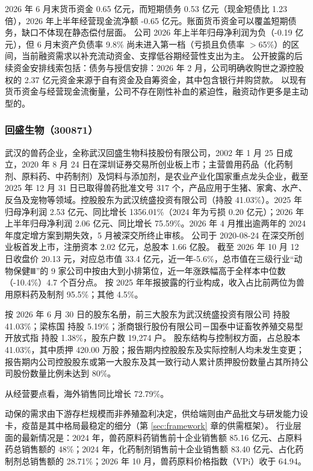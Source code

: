  2026 年 6 月末货币资金 0.65 亿元，而短期债务 0.53 亿元（现金短债比 1.23 倍），2026 年上半年经营现金流净额 -0.65 亿元。账面货币资金可以覆盖短期债务，缺口不体现在静态偿付层面。 公司 2026 年上半年归母净利润为负（-0.19 亿元），但 6 月末资产负债率 9.8\% 尚未进入第一档（亏损且负债率 $>$65\%）的区间，当前融资需求以补充流动资金、支撑低谷期经营性支出为主。 公开披露的后续资金安排线索包括：债务与授信安排：2026 年 2 月，公司明确收购世之源控股权的 2.37 亿元资金来源于自有资金及自筹资金，其中包含银行并购贷款。 以现有货币资金与经营现金流衡量，公司不存在刚性补血的紧迫性，融资动作更多是主动型的。




\subsubsection{回盛生物（300871）}
\label{co:300871}

 武汉的兽药企业，全称武汉回盛生物科技股份有限公司，2002 年 1 月 25 日成立，2020 年 8 月 24 日在深圳证券交易所创业板上市；主营兽用药品（化药制剂、原料药、中药制剂）及饲料与添加剂，是农业产业化国家重点龙头企业，截至 2025 年 12 月 31 日已取得兽药批准文号 317 个，产品应用于生猪、家禽、水产、反刍及宠物等领域。控股股东为武汉统盛投资有限公司（持股 41.03\%）。2025 年归母净利润 2.53 亿元、同比增长 1356.01\%（2024 年为亏损 0.20 亿元）；2026 年上半年归母净利润 2.06 亿元、同比增长 75.59\%。2026 年 4 月推出逾两年的 2024 年度定增方案到期失效，5 月被深交所终止审核。 公司于 2020-08-24 在深交所创业板首发上市，注册资本 2.02 亿元，总股本 1.66 亿股。 截至 2026 年 10 月 12 日收盘价 20.13 元，对应总市值 33.4 亿元，近一年-5.6\%，总市值在三级行业“动物保健Ⅲ”的 9 家公司中按由大到小排第位，近一年涨跌幅高于全样本中位数（-10.4\%）4.7 个百分点。 按 2025 年年报披露的行业构成，收入占比前两位为兽用原料药及制剂 95.5\%；其他 4.5\%。

 按 2026 年 6 月 30 日的股东名册，前三大股东为武汉统盛投资有限公司 持股 41.03\%；梁栋国 持股 5.19\%；浙商银行股份有限公司－国泰中证畜牧养殖交易型开放式指 持股 1.38\%，股东户数 19,274 户。 股东结构与控制权方面，占总股本 41.03\%，其中质押 420.00 万股；报告期内控股股东及实际控制人均未发生变更；报告期内公司控股股东或第一大股东及其一致行动人累计质押股份数量占其所持公司股份数量比例未达到 80\%。

 从经营要点看，海外销售同比增长 72.79\%。

 动保的需求由下游存栏规模而非养殖盈利决定，供给端则由产品批文与研发能力设卡，疫苗是其中格局最稳定的细分（第 \ref{sec:framework} 章的供需框架）。 行业层面的最新情况是：2024 年，兽药原料药销售前十企业销售额 85.16 亿元、占原料药总销售额的 48\%；2024 年，化药制剂销售前十企业销售额 83.40 亿元、占化药制剂总销售额的 28.71\%；2026 年 10 月，兽药原料价格指数（VPi）收于 64.94。

